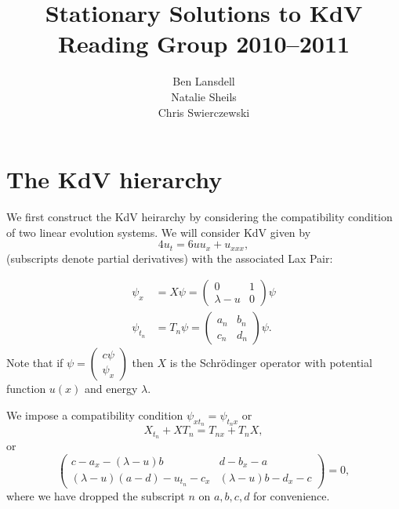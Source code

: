 \documentclass[12pt, a4paper]{article}
\title{
  Stationary Solutions to KdV \\
  {\textsc Reading Group 2010--2011}}
\author{
  Ben Lansdell \\
  Natalie Sheils \\
  Chris Swierczewski}
\begin{document}

\maketitle

\tableofcontents

\newpage

\section{The KdV hierarchy}



We first construct the KdV heirarchy by considering the compatibility
condition of two linear evolution systems. We will consider KdV given
by
\[
  4u_t = 6uu_x + u_{xxx},
\]
(subscripts denote partial derivatives) with the associated Lax Pair:

\begin{equation}\label{lax}
  \begin{split}
    \psi_x &= X \psi = \left(
      \begin{array}{cc}
        0 & 1 \\ \lambda-u & 0
      \end{array}
      \right) \psi \\
    \psi_{t_n} &= T_n\psi = \left(
    \begin{array}{cc}
      a_n & b_n \\ c_n & d_n
    \end{array}
    \right)\psi.
  \end{split}
\end{equation}
Note that if $\psi = \left( \begin{smallmatrix}{c} \psi
  \\ \psi_x \end{smallmatrix} \right)$ then $X$ is the Schr\"odinger
operator with potential function $u(x)$ and energy $\lambda$.

We impose a compatibility condition $\psi_{x t_n}=\psi_{t_n x}$ or
\begin{equation*}
  X_{t_n} + X T_n = T_{nx} + T_n X,
\end{equation*}
or
\begin{equation*}
  \left(
  \begin{array}{cc}
    c - a_x - (\lambda - u) b & d - b_x - a \\
    (\lambda - u)(a - d) - u_{t_n} - c_x & (\lambda - u) b - d_x - c
  \end{array}
  \right) = 0,
\end{equation*}
where we have dropped the subscript $n$ on $a,b,c,d$ for convenience.
\end{document}
